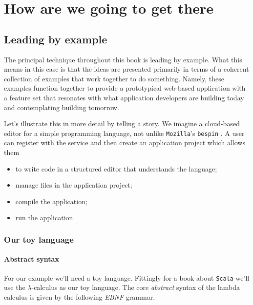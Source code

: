 \section{How are we going to get there}

\subsection{Leading by example}

The principal technique throughout this book is leading by
example. What this means in this case is that the ideas are presented
primarily in terms of a coherent collection of examples that work
together to do something. Namely, these examples function together to
provide a prototypical web-based application with a feature set that
resonates with what application developers are building today and
contemplating building tomorrow.

Let's illustrate this in more detail by telling a story. We imagine a
cloud-based editor for a simple programming language, not unlike
\texttt{Mozilla}'s \texttt{bespin} . A user can register with the
service and then create an application project which allows them
\begin{itemize}
   \item to write code in a structured editor that understands the language;
   \item manage files in the application project;
   \item compile the application;
   \item run the application
\end{itemize}

\subsubsection{Our toy language}

\paragraph{Abstract syntax}
For our example we'll need a toy language. Fittingly for a book about
\texttt{Scala} we'll use the $\lambda$-calculus as our toy
language. The core \textit{abstract} syntax of the lambda calculus is
given by the following \textit{EBNF} grammar.


